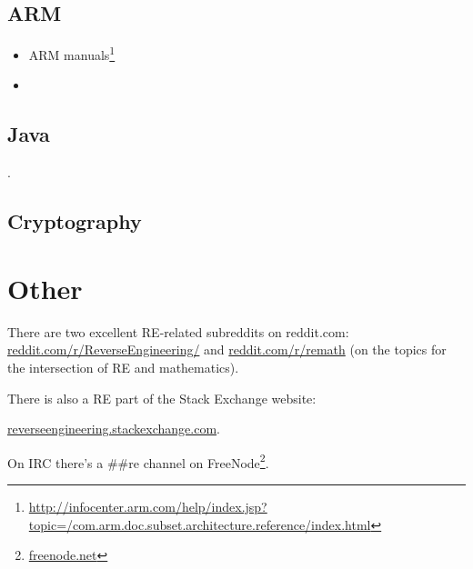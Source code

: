 \section{ARM}

\begin{itemize}
\item ARM manuals\footnote{\AlsoAvailableAs \url{http://infocenter.arm.com/help/index.jsp?topic=/com.arm.doc.subset.architecture.reference/index.html}}

\item \ARMSixFourRefURL
\end{itemize}

\section{Java}

\Javabook.

\section{Cryptography}



\chapter{Other}

There are two excellent \ac{RE}-related subreddits on reddit.com:
\href{http://go.yurichev.com/17027}{reddit.com/r/ReverseEngineering/} and
\href{http://go.yurichev.com/17028}{reddit.com/r/remath}
(on the topics for the intersection of \ac{RE} and mathematics).

There is also a \ac{RE} part of the Stack Exchange website:

\par \href{http://go.yurichev.com/17029}{reverseengineering.stackexchange.com}.

On IRC there's a \#\#re channel on
FreeNode\footnote{\href{http://go.yurichev.com/17030}{freenode.net}}.

